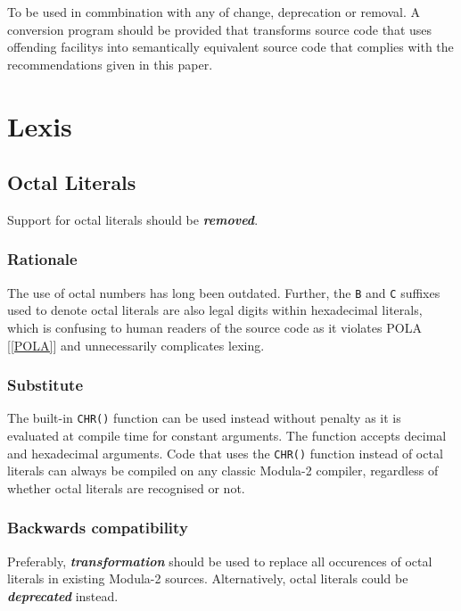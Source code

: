 \documentclass[10pt,a4paper]{article}
\renewcommand{\emph}[1]{\textbf{\textit{#1}}}
\begin{document}
To be used in commbination with any of change, deprecation or removal.
A conversion program should be provided that transforms source code that uses
\glspl{offending facility} into semantically equivalent source code that
complies with the recommendations given in this paper.


\section{Lexis}

\subsection{Octal Literals}

Support for octal literals should be \emph{removed}.

\subsubsection{Rationale}

The use of octal numbers has long been outdated. Further, the \verb|B| and
\verb|C| suffixes used to denote octal literals are also legal digits within
hexadecimal literals, which is confusing to human readers of the source code as
it violates POLA [\ref{POLA}] and unnecessarily complicates lexing.

\subsubsection{Substitute}

The built-in \verb|CHR()| function can be used instead without penalty as it is
evaluated at compile time for constant arguments. The function accepts decimal
and hexadecimal arguments. Code that uses the \verb|CHR()| function instead of
octal literals can always be compiled on any classic Modula-2 compiler,
regardless of whether octal literals are recognised or not.

\subsubsection{Backwards compatibility}

Preferably, \emph{transformation} should be used to replace all occurences of
octal literals in existing Modula-2 sources. Alternatively, octal literals
could be \emph{deprecated} instead.
\end{document}
